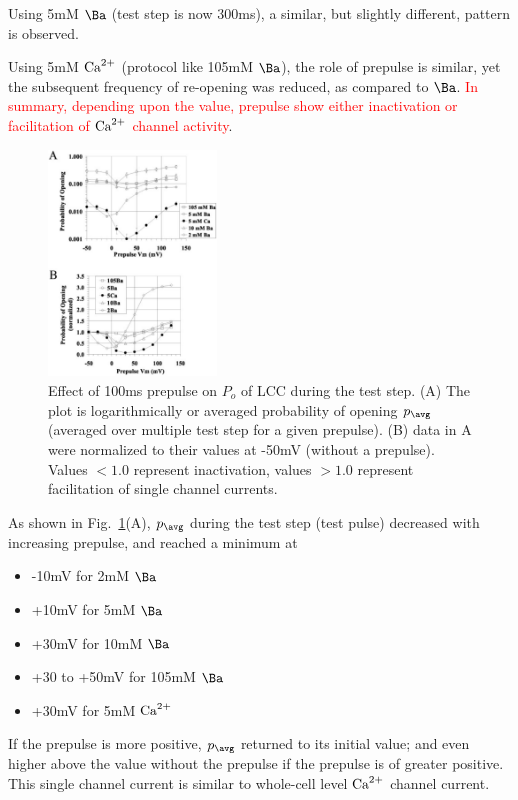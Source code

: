 Using 5mM $\Ba$ (test step is now 300ms), a similar, but slightly
different, pattern is observed.

Using 5mM ${\text{Ca}^{2+}}$ (protocol like 105mM $\Ba$), the role of prepulse is
similar, yet the subsequent frequency of re-opening was reduced, as
compared to $\Ba$. \textcolor{red}{In summary, depending upon the
  value, prepulse show either inactivation or facilitation of ${\text{Ca}^{2+}}$
  channel activity}.

\begin{figure}[hbt]
  \centerline{\includegraphics[height=6cm,
    angle=0]{./images/josephson_2002.eps}}
  \caption{Effect of 100ms prepulse on $P_o$ of LCC during the test
    step. (A) The plot is logarithmically or averaged probability of
    opening $p_\avg$ (averaged over multiple test step for a given
    prepulse). (B) data in A were normalized to their values at -50mV
    (without a prepulse). Values $<1.0$ represent inactivation, values
    $>1.0$ represent facilitation of single channel currents.}
  \label{fig:josephson2002}
\end{figure}

As shown in Fig.~\ref{fig:josephson2002}(A), $p_\avg$ during the test
step (test pulse) decreased with increasing prepulse, and reached a
minimum at
\begin{itemize}
\item -10mV for 2mM $\Ba$
\item +10mV for 5mM $\Ba$
\item +30mV for 10mM $\Ba$
\item +30 to +50mV for 105mM $\Ba$
\item +30mV for 5mM ${\text{Ca}^{2+}}$
\end{itemize}
If the prepulse is more positive, $p_\avg$ returned to its initial
value; and even higher above the value without the prepulse if the
prepulse is of greater positive. This single channel current is
similar to whole-cell level ${\text{Ca}^{2+}}$ channel current. 

